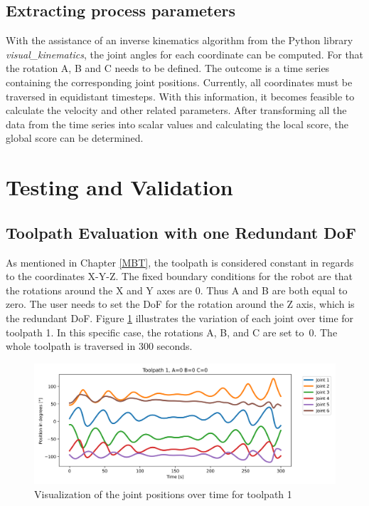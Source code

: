 \subsection{Extracting process parameters}
With the assistance of an inverse kinematics algorithm from the Python library \textit{visual\_kinematics}, the joint angles for each coordinate can be computed. For that the rotation A, B and C needs to be defined. The outcome is a time series containing the corresponding joint positions. Currently, all coordinates must be traversed in equidistant timesteps. With this information, it becomes feasible to calculate the velocity and other related parameters. After transforming all the data from the time series into scalar values and calculating the local score, the global score can be determined.
\newpage
\section{Testing and Validation}%

\subsection{Toolpath Evaluation with one Redundant DoF}
As mentioned in Chapter \ref{MBT}, the toolpath is considered constant in regards to the coordinates X-Y-Z. The fixed boundary conditions for the robot are that the rotations around the X and Y axes are 0. Thus A and B are both equal to zero. The user needs to set the DoF for the rotation around the Z axis, which is the redundant DoF. Figure \ref{TP1ABC0} illustrates the variation of each joint over time for toolpath 1. In this specific case, the rotations A, B, and C are set to~0. The whole toolpath is traversed in 300 seconds. 

\begin{figure}[H]
	\centerline{\includegraphics[width=1\textwidth]{figures/TP1ABC0.png}}
	\caption{Visualization of the joint positions over time for toolpath 1 }
	\label{TP1ABC0}
\end{figure}

